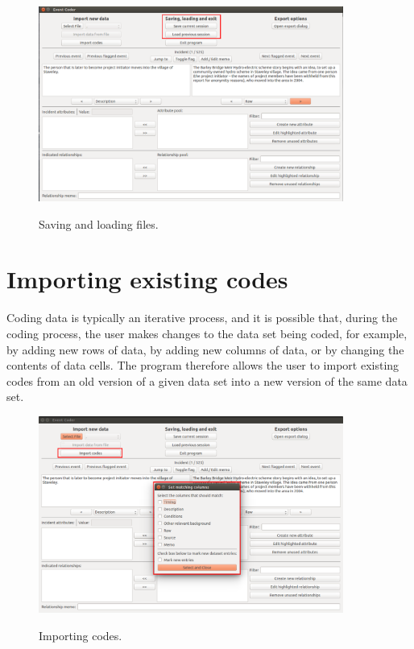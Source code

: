 \documentclass{memoir}
\begin{document}
\begin{figure}[h!]
  \centering
  \caption{Saving and loading files.}
  \includegraphics[width=100mm]{Screenshot_2.pdf}
  \label{fig:saveload}
\end{figure}

\section{Importing existing codes}
\label{sec:importingcodes}

Coding data is typically an iterative process, and it is possible that, during the coding process, the user makes changes to the data set being coded, for example, by adding new rows of data, by adding new columns of data, or by changing the contents of data cells. The program therefore allows the user to import existing codes from an old version of a given data set into a new version of the same data set. 

\begin{figure}[h!]
  \centering
  \caption{Importing codes.}
  \includegraphics[width=100mm]{Screenshot_3.pdf}
  \label{fig:importcodesfig}
\end{figure}
\end{document}
